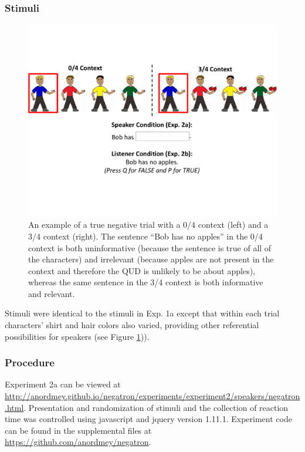 \documentclass[man, floatsintext, noapacite]{apa6}
\begin{document}
\subsubsection{Stimuli}

\begin{figure}[t]
\begin{center} 
\includegraphics[width=6in]{figures/experiment2/trialfig_exp2.pdf}
\caption{\label{fig:exp2_trial} An example of a true negative trial with a 0/4 context (left) and a 3/4 context (right).  The sentence ``Bob has no apples'' in the 0/4 context is both uninformative (because the sentence is true of all of the characters) and irrelevant (because apples are not present in the context and therefore the QUD is unlikely to be about apples), whereas the same sentence in the 3/4 context is both informative and relevant. }
\vspace{-5mm}
\end{center} 
\end{figure}

Stimuli were identical to the stimuli in Exp. 1a except that within each trial characters' shirt and hair colors also varied, providing other referential possibilities for speakers (see Figure \ref{fig:exp2_trial})). 

\subsubsection{Procedure}

Experiment 2a can be viewed at \url{http://anordmey.github.io/negatron/experiments/experiment2/speakers/negatron.html}. Presentation and randomization of stimuli and the collection of reaction time was controlled using javascript and jquery version 1.11.1. Experiment code can be found in the supplemental files at  \url{https://github.com/anordmey/negatron}.
\end{document}
